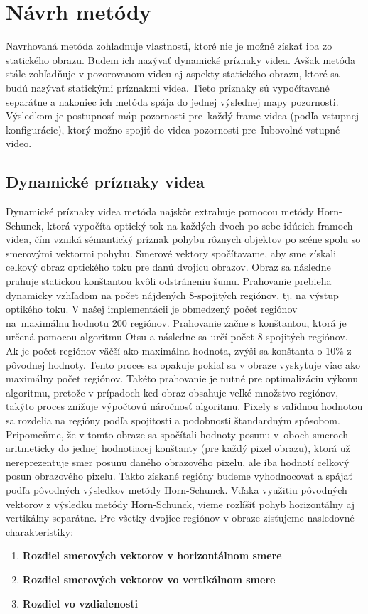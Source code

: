 \section{Návrh metódy}
Navrhovaná metóda zohľadnuje vlastnosti, ktoré nie je možné získať iba zo statického obrazu.
Budem ich nazývať dynamické príznaky videa.
Avšak metóda stále zohľadňuje v pozorovanom videu aj aspekty statického obrazu, ktoré sa budú nazývať statickými príznakmi videa.
Tieto príznaky sú vypočítavané separátne a nakoniec ich metóda spája do jednej výslednej mapy pozornosti. Výsledkom je postupnosť máp pozornosti pre~každý frame videa (podľa vstupnej konfigurácie), ktorý možno spojiť do videa pozornosti pre~ľubovolné vstupné video.

\subsection{Dynamické príznaky videa}
Dynamické príznaky videa metóda najskôr extrahuje pomocou metódy Horn-Schunck\cite{hs-original}, ktorá vypočíta optický tok na každých dvoch po sebe idúcich framoch videa, čím vzniká sémantický príznak pohybu rôznych objektov po scéne spolu so smerovými vektormi pohybu.
Smerové vektory spočítavame, aby sme získali celkový obraz optického toku pre danú dvojicu obrazov.
Obraz sa následne prahuje statickou konštantou kvôli odstráneniu šumu.
Prahovanie prebieha dynamicky vzhľadom na počet nájdených 8-spojitých regiónov, tj. na výstup optikého toku.
V našej implementácii je obmedzený počet regiónov na~maximálnu hodnotu 200 regiónov.
Prahovanie začne s konštantou, ktorá je určená pomocou algoritmu Otsu\cite{otsu} a následne sa určí počet 8-spojitých regiónov. Ak je počet regiónov väčší ako maximálna hodnota, zvýši sa konštanta o 10\% z pôvodnej hodnoty.
Tento proces sa opakuje pokiaľ sa v obraze vyskytuje viac ako maximálny počet regiónov.
Takéto prahovanie je nutné pre optimalizáciu výkonu algoritmu, pretože v prípadoch keď obraz obsahuje veľké množstvo regiónov, takýto proces znižuje výpočtovú náročnosť algoritmu.
Pixely s valídnou hodnotou sa rozdelia na regióny podľa spojitosti a podobnosti štandardným spôsobom.
Pripomeňme, že v tomto obraze sa spočítali hodnoty posunu v~oboch smeroch aritmeticky do jednej hodnotiacej konštanty (pre každý pixel obrazu), ktorá už nereprezentuje smer posunu daného obrazového pixelu, ale iba hodnotí celkový posun obrazového pixelu.
Takto získané regióny budeme vyhodnocovať a spájať podľa pôvodných výsledkov metódy Horn-Schunck.
Vďaka využitiu pôvodných vektorov z výsledku metódy Horn-Schunck, vieme rozlíšiť pohyb horizontálny aj vertikálny separátne.
Pre všetky dvojice regiónov v obraze zisťujeme nasledovné charakteristiky:
\begin{enumerate}
  \item\textbf{Rozdiel smerových vektorov v horizontálnom smere}
  \item\textbf{Rozdiel smerových vektorov vo vertikálnom smere}
  \item\textbf{Rozdiel vo vzdialenosti}
\end{enumerate}
